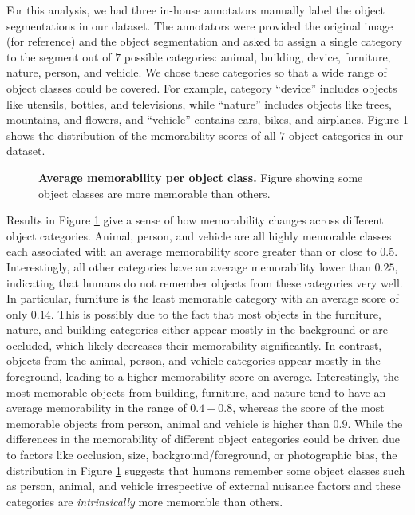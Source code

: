 For this analysis, we had three in-house annotators manually label the object segmentations in our dataset. The annotators were provided the original image (for reference) and the object segmentation and asked to assign a single category to the segment out of $7$ possible categories: animal, building, device, furniture, nature, person, and vehicle. We chose these categories so that a wide range of object classes could be covered. For example, category ``device” includes objects like utensils, bottles, and televisions, while ``nature” includes objects like trees, mountains, and flowers, and “vehicle” contains cars, bikes, and airplanes. Figure \ref{fig:avgMem} shows the distribution of the memorability scores of all $7$ object categories in our dataset.

\begin{figure}[!htb]
\centering
{}
\vspace{-5mm}\caption{\footnotesize\textbf{Average memorability per object class.} Figure showing some object classes are more memorable than others. }\label{fig:avgMem}
\end{figure}

Results in Figure \ref{fig:avgMem} give a sense of how  memorability changes across different object categories. Animal, person, and vehicle are all highly memorable classes each associated with  an average memorability score greater than or close to $0.5$. Interestingly, all other categories have an average memorability lower than $0.25$, indicating that humans do not remember objects from these categories very well. In particular, furniture is the least memorable category with an average score of only $0.14$. This is possibly due to the fact that most objects in the furniture, nature, and building categories either appear mostly in the background or are occluded, which likely decreases their memorability significantly. In contrast, objects from the animal, person, and vehicle categories appear mostly in the foreground, leading to a higher memorability score on average. Interestingly, the most memorable objects from building, furniture, and nature tend to have an average memorability in the range of $0.4 - 0.8$, whereas the score of the most memorable objects from person, animal and vehicle is higher than $0.9$. %
While the differences in the memorability of different object categories could be driven due to factors like occlusion, size, background/foreground, or photographic bias, the distribution in Figure \ref{fig:avgMem} suggests that humans remember some object classes such as person, animal, and vehicle irrespective of external nuisance factors and these categories are \textit{intrinsically} more memorable than others.


